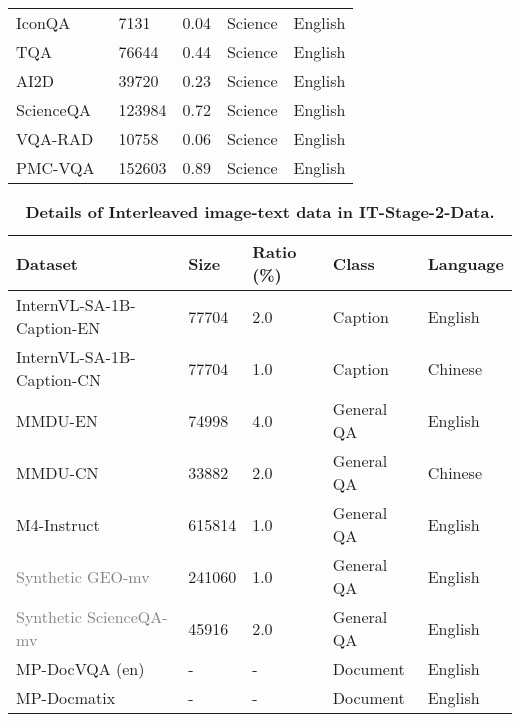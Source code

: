\begin{table}[h]
\begin{tabular}{l|l|l|l|l}
IconQA~\cite{lu2021iconqa}                         & 7131   & 0.04       & Science      & English         \\
TQA~\cite{kembhavi2017you}                         & 76644  & 0.44       & Science      & English         \\
AI2D~\cite{kembhavi2016diagram}                    & 39720  & 0.23       & Science      & English         \\
ScienceQA~\cite{lu2022learn}                       & 123984 & 0.72       & Science      & English         \\
VQA-RAD~\cite{lau2018dataset}                      & 10758  & 0.06       & Science      & English         \\
PMC-VQA~\cite{zhang2023pmcvqa}                     & 152603 & 0.89       & Science      & English          \\
\bottomrule
\end{tabular}
\end{table}


\begin{table}[h]
\centering
\caption{\textbf{Details of Interleaved image-text data in IT-Stage-2-Data.}}
\label{tab:multi_image_stage2}
\setlength{\tabcolsep}{7pt}
\begin{tabular}{l|l|l|l|l}
\hline
Dataset & Size & Ratio (\%) & Class & Language \\
\hline
InternVL-SA-1B-Caption-EN~\cite{chen2023internvl} & 77704 & 2.0 & Caption & English \\
InternVL-SA-1B-Caption-CN~\cite{chen2023internvl} & 77704 & 1.0 & Caption & Chinese \\
MMDU-EN~\cite{wang2024mmduet} & 74998 & 4.0 & General QA & English \\
MMDU-CN~\cite{wang2024mmduet} & 33882 & 2.0 & General QA & Chinese \\
M4-Instruct~\cite{li2024llavanext} & 615814 & 1.0 & General QA & English \\
\textcolor{gray}{Synthetic GEO-mv} & 241060 & 1.0 & General QA & English \\
\textcolor{gray}{Synthetic ScienceQA-mv} & 45916 & 2.0 & General QA & English \\
MP-DocVQA (en)~\cite{tito2023hier} & - &- & Document & English \\
MP-Docmatix~\cite{2024docmatrix} & - &- & Document & English \\
\hline
\end{tabular}
\end{table}

